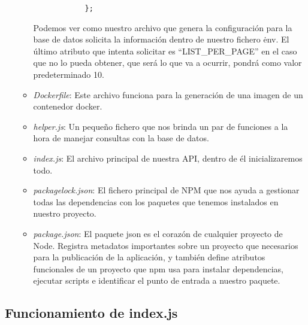 \begin{itemize}
\begin{itemize}
\begin{verbatim}
            };
        \end{verbatim}
        \begin{tcolorbox}
            [colback=green!5!white,colframe=green!75!black,fonttitle=\bfseries,title=Utilización del archivo .env]
            Podemos ver como nuestro archivo que genera la configuración para la base de datos solicita la información dentro de nuestro fichero \.env. El último atributo que intenta solicitar es ``LIST\_PER\_PAGE'' en el caso que no lo pueda obtener, que será lo que va a ocurrir, pondrá como valor predeterminado 10.
        \end{tcolorbox}
        \item \textit{Dockerfile}: Este archivo funciona para la generación de una imagen de un contenedor docker.
        \item \textit{helper.js}: Un pequeño fichero que nos brinda un par de funciones a la hora de manejar consultas con la base de datos.
        \item \textit{index.js}: El archivo principal de nuestra API, dentro de él inicializaremos todo.
        \item \textit{package\-lock.json}: El fichero principal de NPM que nos ayuda a gestionar todas las dependencias con los paquetes que tenemos instalados en nuestro proyecto.
        \item \textit{package.json}: El paquete json es el corazón de cualquier proyecto de Node. Registra metadatos importantes sobre un proyecto que necesarios para la publicación de la aplicación, y también define atributos funcionales de un proyecto que npm usa para instalar dependencias, ejecutar scripts e identificar el punto de entrada a nuestro paquete.
    \end{itemize}
\end{itemize}

\subsection{Funcionamiento de index.js}


